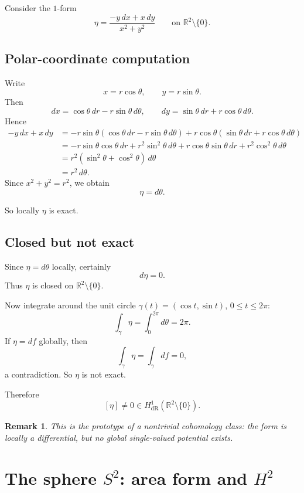 \documentclass[11pt]{article}
\newtheorem{remark}{Remark}
\begin{document}
	Consider the \(1\)-form
	\[
	\eta
	=
	\frac{-y\,dx+x\,dy}{x^2+y^2}
	\qquad\text{on }\mathbb{R}^2\setminus\{0\}.
	\]
	
	\subsection*{Polar-coordinate computation}
	
	Write
	\[
	x=r\cos\theta,\qquad y=r\sin\theta.
	\]
	Then
	\[
	dx=\cos\theta\,dr-r\sin\theta\,d\theta,
	\qquad
	dy=\sin\theta\,dr+r\cos\theta\,d\theta.
	\]
	Hence
	\begin{align*}
		-y\,dx+x\,dy
		&=
		-r\sin\theta(\cos\theta\,dr-r\sin\theta\,d\theta)
		+r\cos\theta(\sin\theta\,dr+r\cos\theta\,d\theta)\\
		&=
		-r\sin\theta\cos\theta\,dr+r^2\sin^2\theta\,d\theta
		+r\cos\theta\sin\theta\,dr+r^2\cos^2\theta\,d\theta\\
		&=
		r^2(\sin^2\theta+\cos^2\theta)\,d\theta\\
		&=
		r^2\,d\theta.
	\end{align*}
	Since \(x^2+y^2=r^2\), we obtain
	\[
	\eta = d\theta.
	\]
	
	So locally \(\eta\) is exact.
	
	\subsection*{Closed but not exact}
	
	Since \(\eta=d\theta\) locally, certainly
	\[
	d\eta=0.
	\]
	Thus \(\eta\) is closed on \(\mathbb{R}^2\setminus\{0\}\).
	
	Now integrate around the unit circle \(\gamma(t)=(\cos t,\sin t)\), \(0\le t\le 2\pi\):
	\[
	\int_{\gamma}\eta
	=
	\int_0^{2\pi} d\theta
	=
	2\pi.
	\]
	If \(\eta=df\) globally, then
	\[
	\int_{\gamma}\eta=\int_{\gamma}df=0,
	\]
	a contradiction. So \(\eta\) is not exact.
	
	Therefore
	\[
	[\eta]\neq 0 \in H^1_{\mathrm{dR}}(\mathbb{R}^2\setminus\{0\}).
	\]
	
	\begin{remark}
		This is the prototype of a nontrivial cohomology class: the form is locally a differential, but no global single-valued potential exists.
	\end{remark}
	
	\section{The sphere \(S^2\): area form and \(H^2\)}
	
\end{document}

